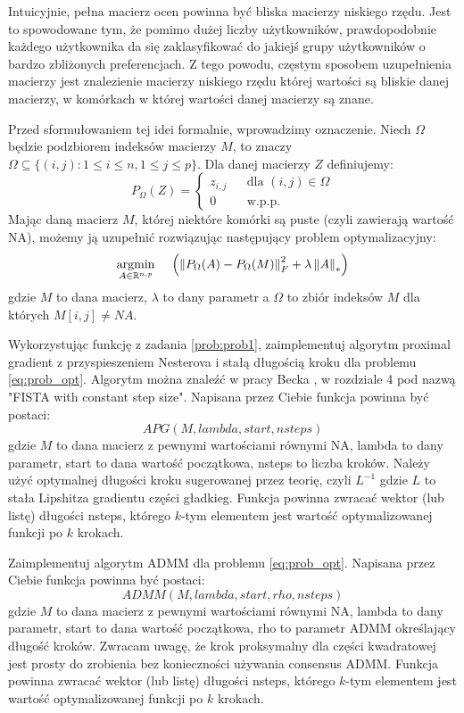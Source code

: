 \documentclass[10pt,a4paper,draft]{report}
\begin{document}
Intuicyjnie, pełna macierz ocen powinna być bliska macierzy niskiego rzędu. Jest to spowodowane tym, że pomimo dużej liczby użytkowników, prawdopodobnie każdego użytkownika da się zaklasyfikować do jakiejś grupy użytkowników o bardzo zbliżonych preferencjach. Z tego powodu, częstym sposobem uzupełnienia macierzy jest znalezienie macierzy niskiego rzędu której wartości są bliskie danej macierzy, w komórkach w której wartości danej macierzy są znane. 

Przed sformułowaniem tej idei formalnie, wprowadzimy oznaczenie. Niech $\Omega$ będzie podzbiorem indeksów macierzy $M$, to znaczy $\Omega \subseteq \{ (i,j): 1 \leq i \leq n, 1 \leq j \leq p\}$. Dla danej macierzy $Z$ definiujemy:
\[
P_{\Omega}(Z) = \left\{
\begin{array}{lcc}
z_{i,j} & & \text{dla } (i,j) \in \Omega \\
0 & & \text{w.p.p.}
\end{array}
\right.
\]
Mając daną macierz $M$, której niektóre komórki są puste (czyli zawierają wartość NA), możemy ją uzupełnić rozwiązując następujący problem optymalizacyjny:
\begin{equation} \label{eq:prob_opt}
\argminl\limits_{A \in \rset^{n,p}} \hspace{12pt} \left( \norm{P_{\Omega}(A) - P_{\Omega}(M)}_F^2 + \lambda \normNuc{A} \right) 
\end{equation}
gdzie $M$ to dana macierz, $\lambda$ to dany parametr a $\Omega$ to zbiór indeksów $M$ dla których $M[i,j] \neq NA$.


\begin{problem}
Wykorzystując funkcję z zadania \ref{prob:prob1}, zaimplementuj algorytm proximal gradient z przyspieszeniem Nesterova i stałą długością kroku dla problemu \ref{eq:prob_opt}. Algorytm można znaleźć w pracy Becka \cite{beck} , w rozdziale 4 pod nazwą "FISTA with constant step size". Napisana przez Ciebie funkcja powinna być postaci:
\[
APG(M, lambda, start, nsteps) 
\]
\noindent gdzie $M$ to dana macierz z pewnymi wartościami równymi NA, lambda to dany parametr, start to dana wartość początkowa, nsteps to liczba kroków. Należy użyć optymalnej długości kroku sugerowanej przez teorię, czyli $L^{-1}$ gdzie $L$ to stała Lipshitza gradientu części gładkieg. Funkcja powinna zwracać wektor (lub listę) długości nsteps, którego $k$-tym elementem jest wartość optymalizowanej funkcji po $k$ krokach.

\end{problem}
\newpage
\begin{problem}
Zaimplementuj algorytm ADMM dla problemu \ref{eq:prob_opt}. Napisana przez Ciebie funkcja powinna być postaci:
\[
ADMM(M, lambda, start, rho, nsteps)
\]
\noindent gdzie $M$ to dana macierz z pewnymi wartościami równymi NA, lambda to dany parametr, start to dana wartość początkowa, rho to parametr ADMM określający długość kroków. Zwracam uwagę, że krok proksymalny dla części kwadratowej jest prosty do zrobienia  bez konieczności używania consensus ADMM. Funkcja powinna zwracać wektor (lub listę) długości nsteps, którego $k$-tym elementem jest wartość optymalizowanej funkcji po $k$ krokach.

\end{problem}
\end{document}
